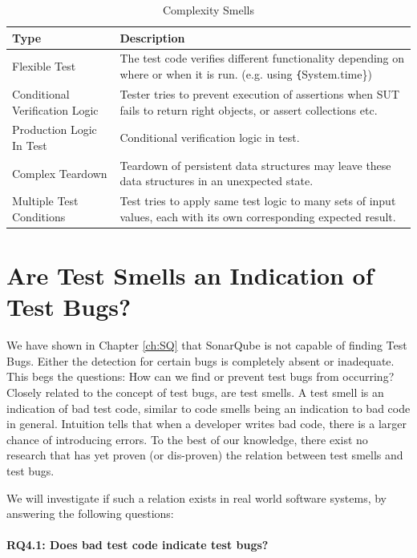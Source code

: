 \documentclass{uvamscse}
\begin{document}
\begin{table}[]
	\centering
	\begin{tabular}{|l|p{10cm}|}
		\hline 
		\textbf{Type}                           & \textbf{Description}                                                                                                              \\
		\hline 
		Flexible Test                  & The test code verifies different functionality depending on where or when it is run. (e.g. using \texttt\{System.time\}) \\
		Conditional Verification Logic & Tester tries to prevent execution of assertions when SUT fails to return right objects, or assert collections etc.       \\
		Production Logic In Test       & Conditional verification logic in test.                                                                                  \\
		Complex Teardown               & Teardown of persistent data structures may leave these data structures in an unexpected state.                           \\
		Multiple Test Conditions       & Test tries to apply same test logic to many sets of input values, each with its own corresponding expected result.  \\
		\hline    
	\end{tabular}
	\label{table:complexityTS}
		\caption{Complexity Smells
			 \cite{meszaros2007xunit}}
\end{table}
\chapter{Are Test Smells an Indication of Test Bugs?}
\label{ch:TS}
We have shown in Chapter \ref{ch:SQ} that SonarQube is not capable of finding Test Bugs. Either the detection for certain bugs is completely absent or inadequate. This begs the questions: How can we find or prevent test bugs from occurring? Closely related to the concept of test bugs, are test smells. A test smell is an indication of bad test code, similar to code smells being an indication to bad code in general. Intuition tells that when a developer writes bad code, there is a larger chance of introducing errors. To the best of our knowledge, there exist no research that has yet proven (or dis-proven) the relation between test smells and test bugs. 

We will investigate if such a relation exists in real world software systems, by answering the following questions: \\
\\
\textbf{RQ4.1: Does bad test code indicate test bugs?} \\
\end{document}
